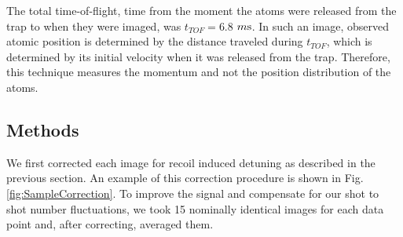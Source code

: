 \documentclass[12pt]{iopart}
\begin{document}
\par The total time-of-flight, time from the moment the atoms were released from the trap to when they were imaged, was $t_{TOF}=6.8$ $m\rm{s}$. In such an image, observed atomic position is determined by the distance traveled during $t_{TOF}$, which is determined by its initial velocity when it was released from the trap. Therefore, this technique measures the momentum and not the position distribution of the atoms. 


\subsection{Methods}
\par We first corrected each image for recoil induced detuning as described in the previous section. An example of this correction procedure is shown in Fig. \ref{fig:SampleCorrection}.  To improve the signal and compensate for our shot to shot number fluctuations, we took 15 nominally identical images for each data point and, after correcting, averaged them.
\end{document}
